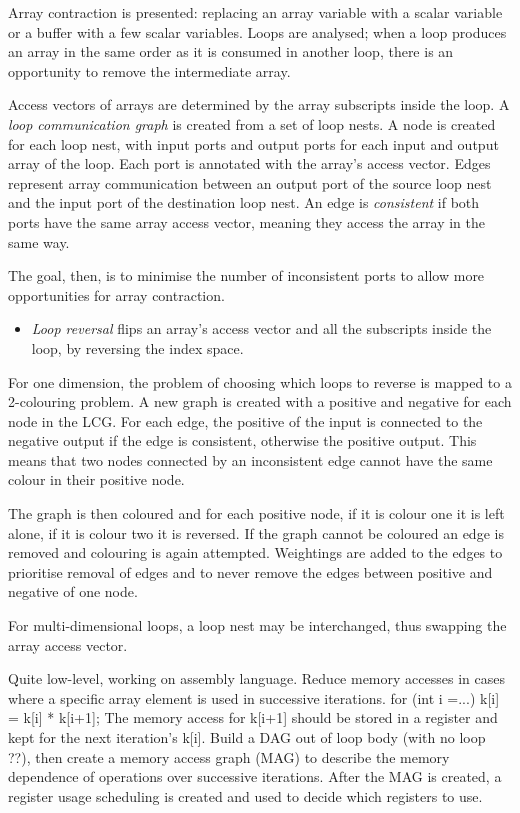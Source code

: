 Array contraction is presented: replacing an array variable with a scalar variable or a buffer with a few scalar variables.
Loops are analysed; when a loop produces an array in the same order as it is consumed in another loop, there is an opportunity to
remove the intermediate array.

Access vectors of arrays are determined by the array subscripts inside the loop.
A \emph{loop communication graph} is created from a set of loop nests. A node is created for each loop nest, with input ports and output ports for each input and output array of the loop. Each port is annotated with the array's access vector.
Edges represent array communication between an output port of the source loop nest and the input port of the destination loop nest.
An edge is \emph{consistent} if both ports have the same array access vector, meaning they access the array in the same way.

The goal, then, is to minimise the number of inconsistent ports to allow more opportunities for array contraction.
\begin{itemize}
\item
\emph{Loop reversal} flips an array's access vector and all the subscripts inside the loop, by reversing the index space.
\end{itemize}
For one dimension, the problem of choosing which loops to reverse is mapped to a 2-colouring problem.
A new graph is created with a positive and negative for each node in the LCG. For each edge, the positive of the input is connected to the negative output if the edge is consistent, otherwise the positive output.
This means that two nodes connected by an inconsistent edge cannot have the same colour in their positive node.

The graph is then coloured and for each positive node, if it is colour one it is left alone, if it is colour two it is reversed.
If the graph cannot be coloured an edge is removed and colouring is again attempted.
Weightings are added to the edges to prioritise removal of edges and to never remove the edges between positive and negative of one node.

For multi-dimensional loops, a loop nest may be interchanged, thus swapping the array access vector.


Quite low-level, working on assembly language.
Reduce memory accesses in cases where a specific array element is used in successive iterations.
  for (int i =...)
    k[i] = k[i] * k[i+1];
The memory access for k[i+1] should be stored in a register and kept for the next iteration's k[i].
Build a DAG out of loop body (with no loop ??), then create a memory access graph (MAG) to describe the memory dependence of operations over successive iterations.
After the MAG is created, a register usage scheduling is created and used to decide which registers to use.


